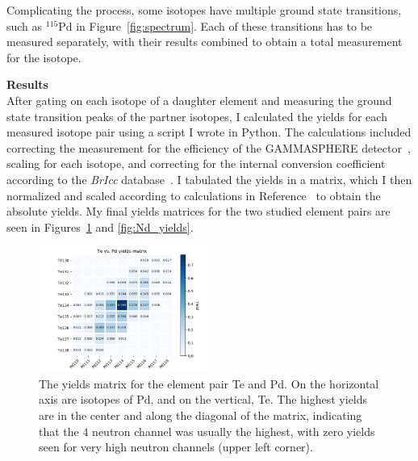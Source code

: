 \documentclass[12pt, letterpaper, twocolumn]{article}
\begin{document}
Complicating the process, some isotopes have multiple ground state transitions, such as $^{115}$Pd in Figure~\ref{fig:spectrum}. Each of these transitions has to be measured separately, with their results combined to obtain a total measurement for the isotope.

\vspace{0.125in}
\noindent\textbf{Results}\\
After gating on each isotope of a daughter element and measuring the ground state transition peaks of the partner isotopes, I calculated the yields for each measured isotope pair using a script I wrote in Python. The calculations included correcting the measurement for the efficiency of the GAMMASPHERE detector~\cite{EnhongPhDThesis}, scaling for each isotope, and correcting for the internal conversion coefficient according to the \textit{BrIcc} database~\cite{KIBEDI2008202}.
I tabulated the yields in a matrix, which I then normalized and scaled according to calculations in Reference~\cite{WAHL19881} to obtain the absolute yields. My final yields matrices for the two studied element pairs are seen in Figures~\ref{fig:Te_yields} and \ref{fig:Nd_yields}.

\begin{figure}[ht]
    \centering
    \includegraphics[width=0.49\textwidth]{img/yields_matrix_heatmap.png}
    \caption{The yields matrix for the element pair Te and Pd. On the horizontal axis are isotopes of Pd, and on the vertical, Te. The highest yields are in the center and along the diagonal of the matrix, indicating that the $4$ neutron channel was usually the highest, with zero yields seen for very high neutron channels (upper left corner).}
    \label{fig:Te_yields}
\end{figure}
\end{document}
